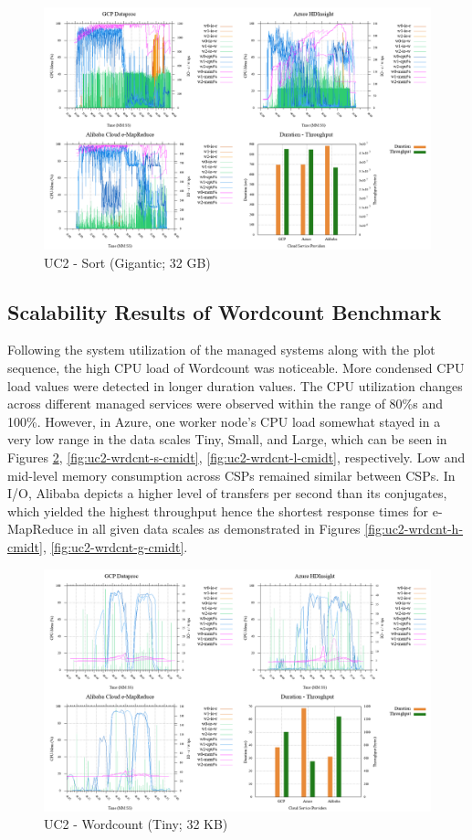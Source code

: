 \documentclass[review]{elsarticle}
\begin{document}
\begin{figure}[p]
	\caption{UC2 - Sort (Gigantic; 32 GB)}
	\label{fig:uc2-srt-g-cmidt}
	\includegraphics[width=\textwidth]{uc2-srt-g-cmidt}
	\centering
\end{figure}


\subsection{Scalability Results of Wordcount Benchmark}
Following the system utilization of the managed systems along with the plot sequence, the high CPU load of Wordcount was noticeable. More condensed CPU load values were detected in longer duration values. The CPU utilization changes across different managed services were observed within the range of 80\%s and 100\%. However, in Azure, one worker node's CPU load somewhat stayed in a very low range in the data scales Tiny, Small, and Large, which can be seen in Figures \ref{fig:uc2-wrdcnt-t-cmidt}, \ref{fig:uc2-wrdcnt-s-cmidt}, \ref{fig:uc2-wrdcnt-l-cmidt}, respectively. 
Low and mid-level memory consumption across CSPs remained similar between CSPs. In I/O, Alibaba depicts a higher level of transfers per second than its conjugates, which yielded the highest throughput hence the shortest response times for e-MapReduce in all given data scales as demonstrated in Figures \ref{fig:uc2-wrdcnt-h-cmidt}, \ref{fig:uc2-wrdcnt-g-cmidt}.

\begin{figure}[p]
	\caption{UC2 - Wordcount (Tiny; 32 KB)}
	\label{fig:uc2-wrdcnt-t-cmidt}
	\includegraphics[width=\textwidth]{uc2-wrdcnt-t-cmidt}
	\centering
\end{figure}
\end{document}
